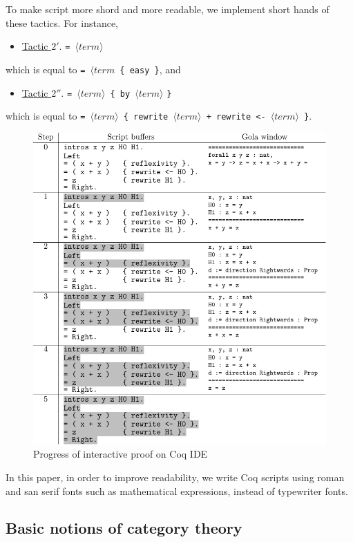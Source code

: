 \documentclass[runningheads, orivec]{llncs}
\begin{document}
To make script more shord and more readable, we implement short hands of these tactics. For instance, 
\begin{itemize}
\item{\underline{Tactic \( 2' \)}.} \verb~= ~\( \langle\mathit{term}\rangle \)
\end{itemize}
which is equal to \verb~= ~\( \langle \mathit{term} \)\verb~ { easy }~, and
\begin{itemize}
\item{\underline{Tactic \( 2'' \)}.} \verb~= ~\( \langle\mathit{term}\rangle \)\verb~ { by ~\( \langle\mathit{term}\rangle \) \verb~}~
\end{itemize}
which is equal to \verb~= ~\( \langle \mathit{term} \rangle \)\verb~ { rewrite ~\( \langle \mathit{term} \rangle \)\verb~ + rewrite <- ~\( \langle \mathit{term} \rangle \)\verb~ }~. 

\begin{figure}[t]
\centering
\includegraphics[width=0.7\linewidth]{figure2.pdf}

\caption{Progress of interactive proof on Coq IDE}
\label{fig:Progress_of_interactive_proof}
\end{figure}
In this paper, in order to improve readability, we write Coq scripts using roman and san serif fonts such as mathematical expressions, instead of typewriter fonts. 

\subsection{Basic notions of category theory}
\end{document}
